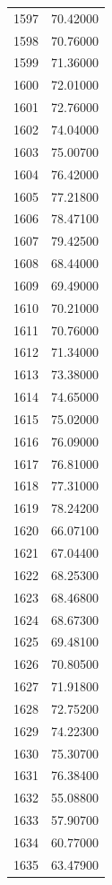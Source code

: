 \documentclass[
  letterpaper,
  DIV=11,
  numbers=noendperiod]{scrreprt}
\begin{document}
\begin{tcolorbox}
\begin{tabular}{lr}
1597 &         70.42000 \\
1598 &         70.76000 \\
1599 &         71.36000 \\
1600 &         72.01000 \\
1601 &         72.76000 \\
1602 &         74.04000 \\
1603 &         75.00700 \\
1604 &         76.42000 \\
1605 &         77.21800 \\
1606 &         78.47100 \\
1607 &         79.42500 \\
1608 &         68.44000 \\
1609 &         69.49000 \\
1610 &         70.21000 \\
1611 &         70.76000 \\
1612 &         71.34000 \\
1613 &         73.38000 \\
1614 &         74.65000 \\
1615 &         75.02000 \\
1616 &         76.09000 \\
1617 &         76.81000 \\
1618 &         77.31000 \\
1619 &         78.24200 \\
1620 &         66.07100 \\
1621 &         67.04400 \\
1622 &         68.25300 \\
1623 &         68.46800 \\
1624 &         68.67300 \\
1625 &         69.48100 \\
1626 &         70.80500 \\
1627 &         71.91800 \\
1628 &         72.75200 \\
1629 &         74.22300 \\
1630 &         75.30700 \\
1631 &         76.38400 \\
1632 &         55.08800 \\
1633 &         57.90700 \\
1634 &         60.77000 \\
1635 &         63.47900 \\

\end{tabular}
\end{tcolorbox}
\end{document}
